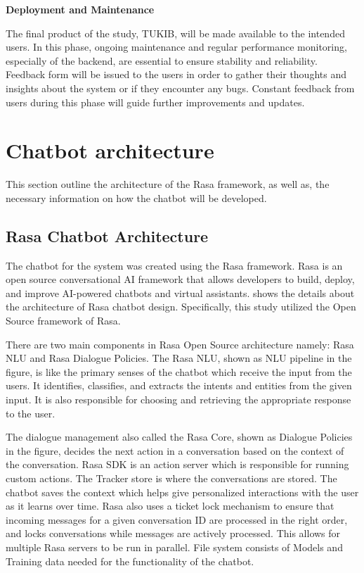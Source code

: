\textbf{Deployment and Maintenance}

The final product of the study, TUKIB, will be made available to the intended users. In this phase, ongoing maintenance and regular performance monitoring, especially of the backend, are essential to ensure stability and reliability. Feedback form will be issued to the users in order to gather their thoughts and insights about the system or if they encounter any bugs. Constant feedback from users during this phase will guide further improvements and updates.

\section{Chatbot architecture}

This section outline the architecture of the Rasa framework, as well as, the necessary information on how the chatbot will be developed.

\subsection{Rasa Chatbot Architecture}

The chatbot for the system was created using the Rasa framework. Rasa is an open source conversational AI framework that allows developers to build, deploy, and improve AI-powered chatbots and virtual assistants.  shows the details about the architecture of Rasa chatbot design. Specifically, this study utilized the Open Source framework of Rasa.

There are two main components in Rasa Open Source architecture namely: Rasa NLU and Rasa Dialogue Policies. The Rasa NLU, shown as NLU pipeline in the figure, is like the primary senses of the chatbot which receive the input from the users. It identifies, classifies, and extracts the intents and entities from the given input. It is also responsible for choosing and retrieving the appropriate response to the user. 

The dialogue management also called the Rasa Core, shown as Dialogue Policies in the figure, decides the next action in a conversation based on the context of the conversation. Rasa SDK is an action server which is responsible for running custom actions. The Tracker store is where the conversations are stored. The chatbot saves the context which helps give personalized interactions with the user as it learns over time. Rasa also uses a ticket lock mechanism to ensure that incoming messages for a given conversation ID are processed in the right order, and locks conversations while messages are actively processed. This allows for multiple Rasa servers to be run in parallel. File system consists of Models and Training data needed for the functionality of the chatbot.

